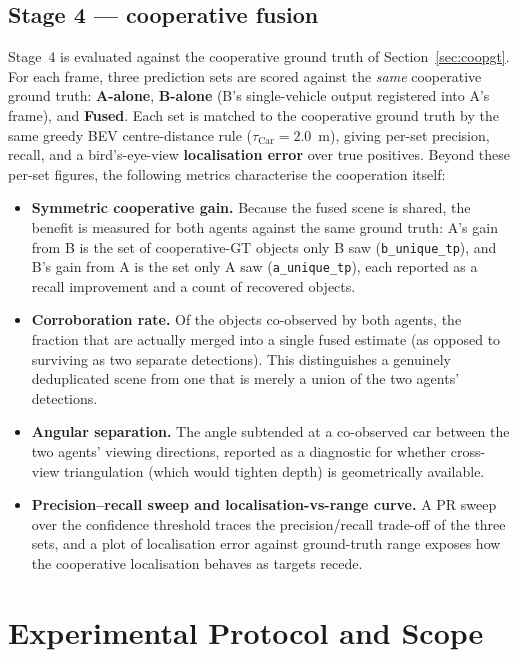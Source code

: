 \subsection{Stage 4 --- cooperative fusion}
\label{sec:metricsfusion}

Stage~4 is evaluated against the cooperative ground truth of
Section~\ref{sec:coopgt}. For each frame, three prediction sets are scored against
the \emph{same} cooperative ground truth: \textbf{A-alone}, \textbf{B-alone} (B's
single-vehicle output registered into A's frame), and \textbf{Fused}. Each set is
matched to the cooperative ground truth by the same greedy BEV centre-distance rule
($\tau_{\text{Car}}=2.0$~m), giving per-set precision, recall, and a bird's-eye-view
\textbf{localisation error} over true positives. Beyond these per-set figures, the
following metrics characterise the cooperation itself:

\begin{itemize}[leftmargin=*,itemsep=3pt]
  \item \textbf{Symmetric cooperative gain.} Because the fused scene is shared, the
  benefit is measured for both agents against the same ground truth: A's gain from B
  is the set of cooperative-GT objects only B saw (\texttt{b\_unique\_tp}), and B's
  gain from A is the set only A saw (\texttt{a\_unique\_tp}), each reported as a
  recall improvement and a count of recovered objects.
  \item \textbf{Corroboration rate.} Of the objects co-observed by both agents, the
  fraction that are actually merged into a single fused estimate (as opposed to
  surviving as two separate detections). This distinguishes a genuinely
  deduplicated scene from one that is merely a union of the two agents' detections.
  \item \textbf{Angular separation.} The angle subtended at a co-observed car between
  the two agents' viewing directions, reported as a diagnostic for whether
  cross-view triangulation (which would tighten depth) is geometrically available.
  \item \textbf{Precision--recall sweep and localisation-vs-range curve.} A PR sweep
  over the confidence threshold traces the precision/recall trade-off of the three
  sets, and a plot of localisation error against ground-truth range exposes how the
  cooperative localisation behaves as targets recede.
\end{itemize}

\section{Experimental Protocol and Scope}
\label{sec:protocol}

